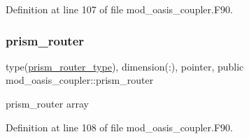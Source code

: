Definition at line 107 of file mod\+\_\+oasis\+\_\+coupler.\+F90.

\mbox{\label{namespacemod__oasis__coupler_a33dbf692ad73f83f73fe083e252badd8}} 
\subsubsection{\texorpdfstring{prism\+\_\+router}{prism\_router}}
{\footnotesize\ttfamily type(\hyperlink{structmod__oasis__coupler_1_1prism__router__type}{prism\+\_\+router\+\_\+type}), dimension(\+:), pointer, public mod\+\_\+oasis\+\_\+coupler\+::prism\+\_\+router}



prism\+\_\+router array 



Definition at line 108 of file mod\+\_\+oasis\+\_\+coupler.\+F90.

